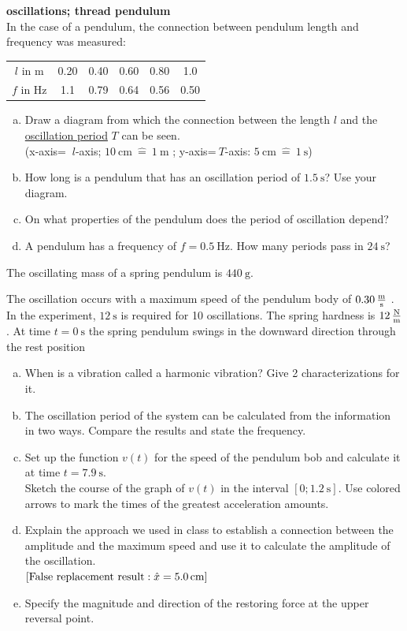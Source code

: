 \documentclass[a4paper]{article}
\begin{document}
	
	\begin{enumerate}[1.]
		
		\item {\bf oscillations; thread pendulum}\\
		In the case of a pendulum, the connection between pendulum length and frequency was measured:
		
		\begin{tabular}{cccccc}
			$l$ in m & 0.20 & 0.40 & 0.60 & 0.80 & 1.0 \\
			$f$ in Hz & 1.1 & 0.79 & 0.64 & 0.56 & 0.50
		\end{tabular}
		
		\begin{enumerate}[a)]
			\item Draw a diagram from which the connection between the length $l$ and the \underline{oscillation period} $T$ can be seen.\\
			(x-axis= $ ~ l $-axis; $\SI{10}{\centi\meter}~\hat{=}~\SI{1}{\meter}$ ;
			y-axis=$ ~T$-axis: $\SI{5}{\centi\meter}~\hat{=}~\SI{1}{\second}$)
			\item How long is a pendulum that has an oscillation period of $\SI{1.5}{\second}$? Use your diagram.
			\item On what properties of the pendulum does the period of oscillation depend?
			\item A pendulum has a frequency of $f=\SI{0.5}{\hertz}$. How many periods pass in $\SI{24}{\second}$?
		\end{enumerate}
		
		
		{\bf \item The oscillating mass of a spring pendulum is $\SI{440}{\gram}$.} The oscillation occurs with a maximum speed of the pendulum body of $\SI{0.30}{\meter\over\second}$ . In the experiment, $\SI{12}{\second}$ is required for 10 oscillations. The spring hardness is $\SI{12}{\newton\over\meter}$. At time $t = \SI{0}{\second}$ the spring pendulum swings in the downward direction through the rest position
		
		\begin{enumerate}[a)]
			\item When is a vibration called a harmonic vibration? Give 2 characterizations for it.
			\item The oscillation period of the system can be calculated from the information in two ways. Compare the results and state the frequency.
			\item Set up the function $v(t)$ for the speed of the pendulum bob and calculate it at time $ t=\SI{7,9}{\second}$. \\
			Sketch the course of the graph of $v(t)$ in the interval $[0;\SI{1,2}{\second}]$. Use colored arrows to mark the times of the greatest acceleration amounts.
			\item Explain the approach we used in class to establish a connection between the amplitude and the maximum speed and use it to calculate the amplitude of the oscillation.\\
			$[\textnormal{False replacement result}: \hat{x}=\SI{5,0}{\centi\meter}]$
			\item Specify the magnitude and direction of the restoring force at the upper reversal point.
			

\end{enumerate}
\end{enumerate}
\end{document}
